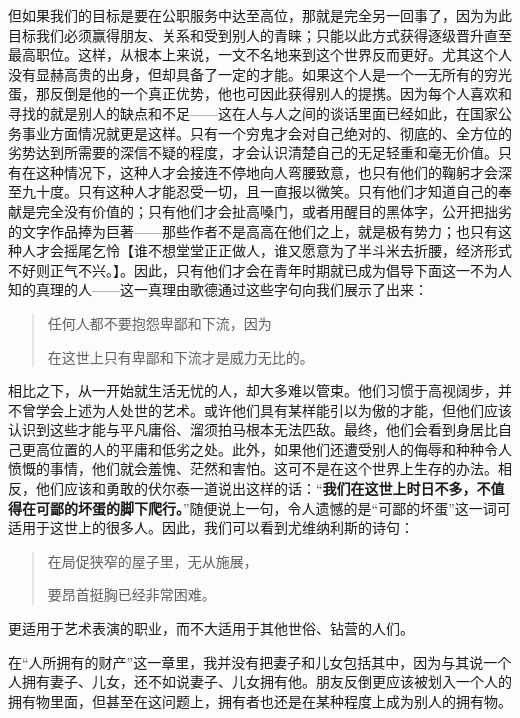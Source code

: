 \documentclass[12pt,oneside]{book}
\begin{document}
但如果我们的目标是要在公职服务中达至高位，那就是完全另一回事了，因为为此目标我们必须赢得朋友、关系和受到别人的青睐；只能以此方式获得逐级晋升直至最高职位。这样，从根本上来说，一文不名地来到这个世界反而更好。尤其这个人没有显赫高贵的出身，但却具备了一定的才能。如果这个人是一个一无所有的穷光蛋，那反倒是他的一个真正优势，他也可因此获得别人的提携。因为每个人喜欢和寻找的就是别人的缺点和不足——这在人与人之间的谈话里面已经如此，在国家公务事业方面情况就更是这样。只有一个穷鬼才会对自己绝对的、彻底的、全方位的劣势达到所需要的深信不疑的程度，才会认识清楚自己的无足轻重和毫无价值。只有在这种情况下，这种人才会接连不停地向人弯腰致意，也只有他们的鞠躬才会深至九十度。只有这种人才能忍受一切，且一直报以微笑。只有他们才知道自己的奉献是完全没有价值的；只有他们才会扯高嗓门，或者用醒目的黑体字，公开把拙劣的文字作品捧为巨著——那些作者不是高高在他们之上，就是极有势力；也只有这种人才会摇尾乞怜【谁不想堂堂正正做人，谁又愿意为了半斗米去折腰，经济形式不好则正气不兴。】。因此，只有他们才会在青年时期就已成为倡导下面这一不为人知的真理的人——这一真理由歌德通过这些字句向我们展示了出来： 

 
\begin{quotation}
任何人都不要抱怨卑鄙和下流，因为 

在这世上只有卑鄙和下流才是威力无比的。 
\end{quotation}
 

相比之下，从一开始就生活无忧的人，却大多难以管束。他们习惯于高视阔步，并不曾学会上述为人处世的艺术。或许他们具有某样能引以为傲的才能，但他们应该认识到这些才能与平凡庸俗、溜须拍马根本无法匹敌。最终，他们会看到身居比自己更高位置的人的平庸和低劣之处。此外，如果他们还遭受别人的侮辱和种种令人愤慨的事情，他们就会羞愧、茫然和害怕。这可不是在这个世界上生存的办法。相反，他们应该和勇敢的伏尔泰一道说出这样的话：“\textbf{我们在这世上时日不多，不值得在可鄙的坏蛋的脚下爬行。}”随便说上一句，令人遗憾的是“可鄙的坏蛋”这一词可适用于这世上的很多人。因此，我们可以看到尤维纳利斯的诗句：

 
\begin{quotation}
在局促狭窄的屋子里，无从施展， 

要昂首挺胸已经非常困难。 
\end{quotation}


更适用于艺术表演的职业，而不大适用于其他世俗、钻营的人们。 

在“人所拥有的财产”这一章里，我并没有把妻子和儿女包括其中，因为与其说一个人拥有妻子、儿女，还不如说妻子、儿女拥有他。朋友反倒更应该被划入一个人的拥有物里面，但甚至在这问题上，拥有者也还是在某种程度上成为别人的拥有物。 
\end{document}
